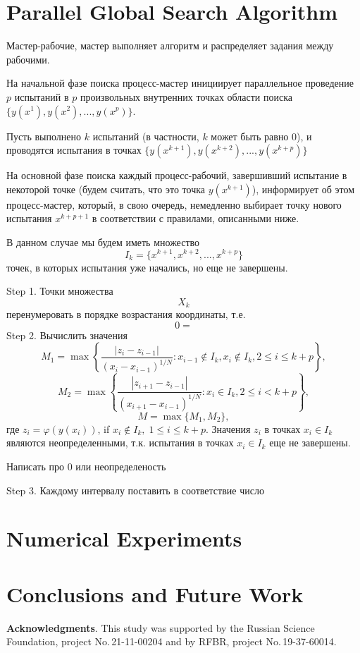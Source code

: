 \documentclass{svproc}
\begin{document}
\section{Parallel Global Search Algorithm}\label{Sec_GSA}

Мастер-рабочие, мастер выполняет алгоритм и распределяет задания между рабочими. 

На начальной фазе поиска процесс-мастер инициирует параллельное проведение $p$ испытаний в $p$ произвольных внутренних точках области поиска $\{y(x^1), y(x^2), ...,y(x^p)\}$.

Пусть выполнено $k$ испытаний (в частности, $k$ может быть равно 0), и проводятся испытания в точках $\{y(x^{k+1}), y(x^{k+2}), ...,y(x^{k+p})\}$

На основной фазе поиска каждый процесс-рабочий, завершивший испытание в некоторой точке (будем считать, что это точка $y(x^{k+1})$), информирует об этом процесс-мастер, который, в свою очередь, немедленно выбирает точку нового испытания $x^{k+p+1}$ в соответствии с правилами, описанными ниже.

В данном случае мы будем иметь множество 
\[
I_k = \{x^{k+1},x^{k+2},...,x^{k+p}\}
\]
точек, в которых испытания уже начались, но еще не завершены.

Step 1. Точки множества 
\[
X_k
\]
перенумеровать в порядке возрастания координаты, т.е.
\[
0=
\]
Step 2. Вычислить значения 
\[
M_1=\max \left\{ \frac{ \left|z_i - z_{i-1} \right|}{(x_i-x_{i-1})^{1/N}} : x_{i-1} \notin I_k, x_i \notin I_k, 2\leq i\leq k+p \right\},
\]
\[
M_2=\max \left\{ \frac{ \left|z_{i+1} - z_{i-1} \right|}{(x_{i+1}-x_{i-1})^{1/N}} : x_i \in I_k, 2\leq i < k+p \right\},
\]
\[
M=\max\{M_1,M_2\},
\]
где $z_i=\varphi(y(x_i))$, if $x_i \notin I_k, \; 1\leq i \leq k+p$. Значения $z_i$ в точках $x_i \in I_k$ являются неопределенными, т.к. испытания в точках $x_i \in I_k$ еще не завершены.

Написать про 0 или неопределеность

Step 3. Каждому интервалу поставить в соответствие число 


\section{Numerical Experiments}\label{Sec_Exp}


\section{Conclusions and Future Work}


\medskip

\textbf{Acknowledgments}. This study was supported by the Russian Science Foundation, project No.\,21-11-00204 and by RFBR, project No.\,19-37-60014.

%
%

{}
\end{document}
